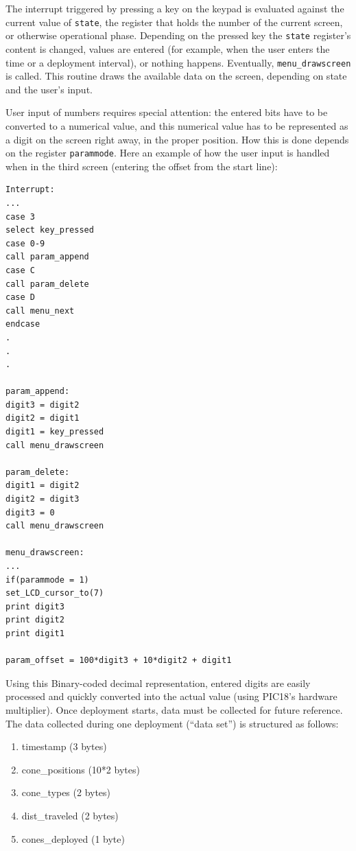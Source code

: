 \documentclass[11pt]{report}
\begin{document}
The interrupt triggered by pressing a key on the keypad is evaluated against the current value of {\tt state}, the register that holds the number of the current screen, or otherwise operational phase. Depending on the pressed key the {\tt state} register's content is changed, values are entered (for example, when the user enters the time or a deployment interval), or nothing happens. Eventually, {\tt menu\_drawscreen} is called. This routine draws the available data on the screen, depending on state and the user's input.

User input of numbers requires special attention: the entered bits have to be converted to a numerical value, and this numerical value has to be represented as a digit on the screen right away, in the proper position. How this is done depends on the register {\tt parammode}. Here an example of how the user input is handled when in the third screen (entering the offset from the start line):

\begin{verbatim}
Interrupt:
...
case 3
select key_pressed
case 0-9
call param_append
case C
call param_delete
case D
call menu_next
endcase
.
.
.

param_append:
digit3 = digit2
digit2 = digit1
digit1 = key_pressed
call menu_drawscreen

param_delete:
digit1 = digit2
digit2 = digit3
digit3 = 0
call menu_drawscreen

menu_drawscreen:
...
if(parammode = 1)
set_LCD_cursor_to(7)
print digit3
print digit2
print digit1

param_offset = 100*digit3 + 10*digit2 + digit1
\end{verbatim}


Using this Binary-coded decimal representation, entered digits are easily processed and quickly converted into the actual value (using PIC18's hardware multiplier). Once deployment starts, data must be collected for future reference. The data collected during one deployment (``data set'') is structured as follows:

\begin{enumerate}
\item{timestamp (3 bytes)}
\item{cone\_positions (10*2 bytes)}
\item{cone\_types (2 bytes)}
\item{dist\_traveled (2 bytes)}
\item{cones\_deployed (1 byte)}
\end{enumerate}
\end{document}
